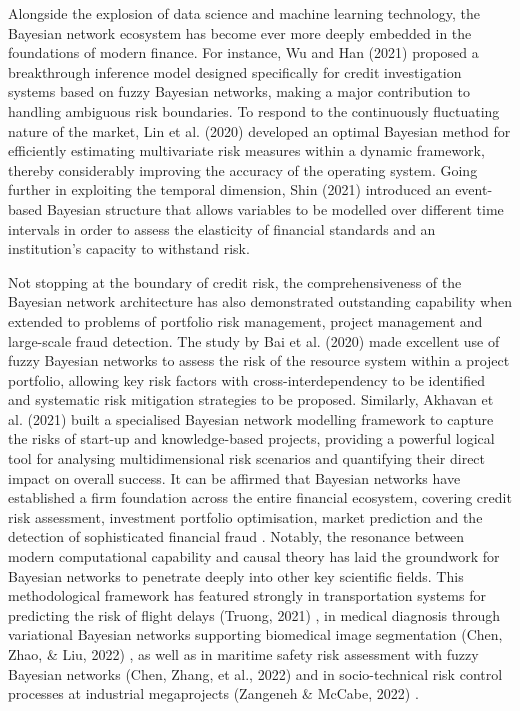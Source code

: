 Alongside the explosion of data science and machine learning technology, the Bayesian network ecosystem has become ever more deeply embedded in the foundations of modern finance. For instance, Wu and Han (2021) \cite{wu2021novel} proposed a breakthrough inference model designed specifically for credit investigation systems based on fuzzy Bayesian networks, making a major contribution to handling ambiguous risk boundaries. To respond to the continuously fluctuating nature of the market, Lin et al. (2020) \cite{lin2020behavioral} developed an optimal Bayesian method for efficiently estimating multivariate risk measures within a dynamic framework, thereby considerably improving the accuracy of the operating system. Going further in exploiting the temporal dimension, Shin (2021) \cite{shin2021event} introduced an event-based Bayesian structure that allows variables to be modelled over different time intervals in order to assess the elasticity of financial standards and an institution's capacity to withstand risk.

Not stopping at the boundary of credit risk, the comprehensiveness of the Bayesian network architecture has also demonstrated outstanding capability when extended to problems of portfolio risk management, project management and large-scale fraud detection. The study by Bai et al. (2020) \cite{bai2020project} made excellent use of fuzzy Bayesian networks to assess the risk of the resource system within a project portfolio, allowing key risk factors with cross-interdependency to be identified and systematic risk mitigation strategies to be proposed. Similarly, Akhavan et al. (2021) \cite{akhavan2021risk} built a specialised Bayesian network modelling framework to capture the risks of start-up and knowledge-based projects, providing a powerful logical tool for analysing multidimensional risk scenarios and quantifying their direct impact on overall success. It can be affirmed that Bayesian networks have established a firm foundation across the entire financial ecosystem, covering credit risk assessment, investment portfolio optimisation, market prediction and the detection of sophisticated financial fraud \cite{liu2024credit}. Notably, the resonance between modern computational capability and causal theory has laid the groundwork for Bayesian networks to penetrate deeply into other key scientific fields. This methodological framework has featured strongly in transportation systems for predicting the risk of flight delays (Truong, 2021) \cite{truong2021causal}, in medical diagnosis through variational Bayesian networks supporting biomedical image segmentation (Chen, Zhao, \& Liu, 2022) \cite{chen2022medical}, as well as in maritime safety risk assessment with fuzzy Bayesian networks (Chen, Zhang, et al., 2022) \cite{chen2022marine} and in socio-technical risk control processes at industrial megaprojects (Zangeneh \& McCabe, 2022) \cite{zangeneh2022modelling}.

